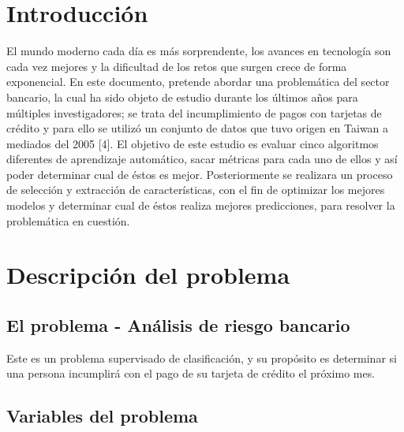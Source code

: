 \documentclass[conference]{IEEEtran}
\begin{document}
\section{Introducción}
El mundo moderno cada día es más sorprendente, los avances en tecnología son cada vez mejores y la dificultad de los retos que surgen crece de forma exponencial. En este documento, pretende abordar una problemática del sector bancario, la cual ha sido objeto de estudio durante los últimos años para múltiples investigadores; se trata del incumplimiento de pagos con tarjetas de crédito y para ello se utilizó un conjunto de datos que tuvo origen en Taiwan a mediados del 2005 [4]. El objetivo de este estudio es evaluar cinco algoritmos diferentes de aprendizaje automático, sacar métricas para cada uno de ellos y así poder determinar cual de éstos es mejor. Posteriormente se realizara un proceso de selección y extracción de características, con el fin de optimizar los mejores modelos y determinar cual de éstos realiza mejores predicciones, para resolver la problemática en cuestión. 

\section{Descripción del problema}

\subsection{El problema - Análisis de riesgo bancario}
Este es un problema supervisado de clasificación, y su propósito es determinar si una persona incumplirá con el pago de su tarjeta de crédito el próximo mes.

\subsection{Variables del problema}
\end{document}
